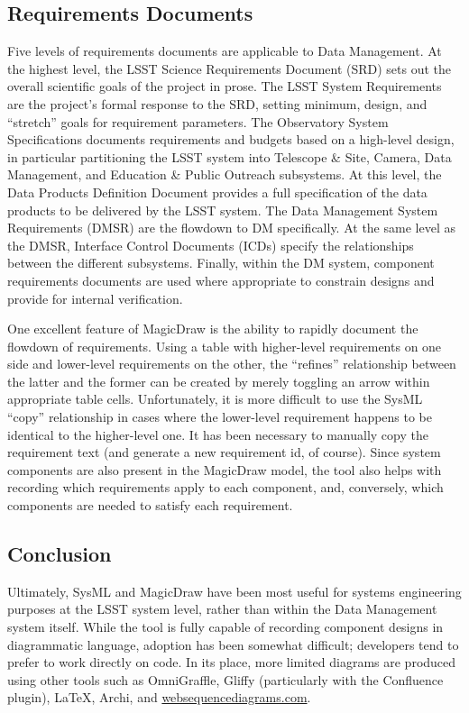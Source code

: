 \subsection{Requirements Documents}

Five levels of requirements documents are applicable to Data Management.
At the highest level, the LSST Science Requirements Document (SRD)\cite{LPM-17} sets out the overall scientific goals of the project in prose.
The LSST System Requirements\cite{LSE-29} are the project's formal response to the SRD, setting minimum, design, and ``stretch'' goals for requirement parameters.
The Observatory System Specifications\cite{LSE-30} documents requirements and budgets based on a high-level design, in particular partitioning the LSST system into Telescope \& Site, Camera, Data Management, and Education \& Public Outreach subsystems.
At this level, the Data Products Definition Document\cite{LSE-163} provides a full specification of the data products to be delivered by the LSST system.
The Data Management System Requirements (DMSR)\cite{LSE-61} are the flowdown to DM specifically.
At the same level as the DMSR, Interface Control Documents (ICDs) specify the relationships between the different subsystems.
Finally, within the DM system, component requirements documents are used where appropriate to constrain designs and provide for internal verification.

One  excellent feature of MagicDraw is the ability to rapidly document the flowdown of requirements.
Using a table with higher-level requirements on one side and lower-level requirements on the other, the ``refines'' relationship between the latter and the former can be created by merely toggling an arrow within appropriate table cells.
Unfortunately, it is more difficult to use the SysML ``copy'' relationship in cases where the lower-level requirement happens to be identical to the higher-level one.
It has been necessary to manually copy the requirement text (and generate a new requirement id, of course).
Since system components are also present in the MagicDraw model, the tool also helps with recording which requirements apply to each component, and, conversely, which components are needed to satisfy each requirement.

\subsection{Conclusion}

Ultimately, SysML and MagicDraw have been most useful for systems engineering purposes at the LSST system level, rather than within the Data Management system itself.
While the tool is fully capable of recording component designs in diagrammatic language, adoption has been somewhat difficult; developers tend to prefer to work directly on code.
In its place, more limited diagrams are produced using other tools such as OmniGraffle, Gliffy (particularly with the Confluence plugin), LaTeX, Archi, and \href{http://websequencediagrams.com}{websequencediagrams.com}.
